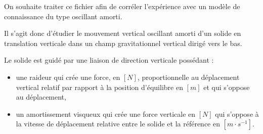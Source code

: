 On souhaite traiter ce fichier afin de corréler l'expérience avec un modèle de connaissance du type oscillant amorti.

\medskip
Il s'agit donc d'étudier le mouvement vertical oscillant amorti d'un solide en translation verticale dans un champ gravitationnel vertical dirigé vers le bas.

 Le solide est guidé par une liaison de direction verticale possédant :
\begin{itemize}
\item une raideur qui crée une force, en $[N]$, proportionnelle au déplacement vertical relatif par rapport à la position d'équilibre en $[m]$ et qui s'oppose au déplacement,
\item un amortissement visqueux qui crée une force verticale en $[N]$ qui s'oppose à la vitesse de déplacement relative entre le solide et la référence en $[m \cdot s^{-1}]$.
\end{itemize}
